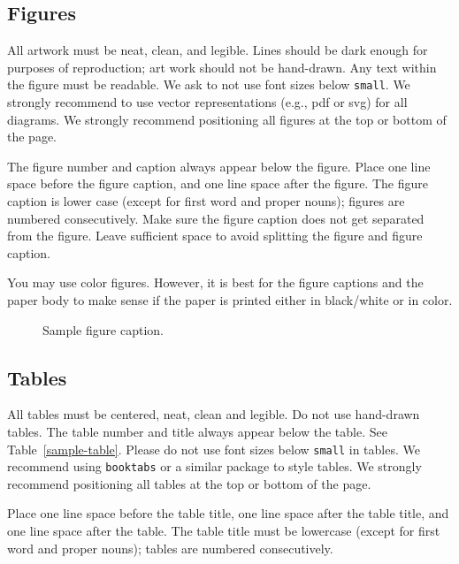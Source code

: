 \documentclass{article} %
\begin{document}
\subsection{Figures}

All artwork must be neat, clean, and legible. Lines should be dark
enough for purposes of reproduction; art work should not be
hand-drawn. Any text within the figure must be readable. We ask to not use font sizes below {\tt small}. We strongly recommend to use vector representations (e.g., pdf or svg) for all diagrams. 
We strongly recommend positioning all figures at the top or bottom of the page.

The figure number and caption always appear below the figure. Place one line space before the figure caption, and one line space after the figure. The figure caption is lower case (except for first word and proper nouns); figures are numbered consecutively.
Make sure the figure caption does not get separated from the figure.
Leave sufficient space to avoid splitting the figure and figure caption.

You may use color figures.
However, it is best for the
figure captions and the paper body to make sense if the paper is printed
either in black/white or in color.
\begin{figure}[t]
\begin{center}
\fbox{\rule[-.5cm]{0cm}{4cm} \rule[-.5cm]{4cm}{0cm}}
\end{center}
\caption{Sample figure caption.}
\end{figure}

\subsection{Tables}

All tables must be centered, neat, clean and legible. Do not use hand-drawn tables. The table number and title always appear below the table. See Table~\ref{sample-table}. Please do not use font sizes below {\tt small} in tables. We recommend using {\tt booktabs} or a similar package to style tables. 
We strongly recommend positioning all tables at the top or bottom of the page.

Place one line space before the table title, one line space after the table title, and one line space after the table. The table title must be lowercase (except for first word and proper nouns); tables are numbered consecutively.
\end{document}
